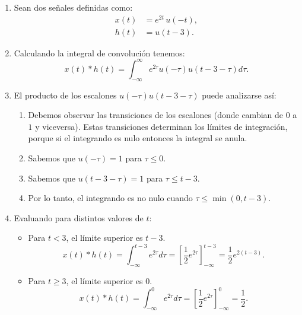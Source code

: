\documentclass[11pt,a4paper,openany]{book}
\begin{document}
\begin{enumerate}
	
	\item Sean dos señales definidas como:
	\begin{align}
		x(t) &= e^{2t} \, u(-t) ,  \\
		h(t) &= u(t-3).
	\end{align}
	
	\item Calculando la integral de convolución tenemos:
	\begin{equation}
		x(t) * h(t) = \int_{-\infty}^{\infty} e^{2\tau} u(-\tau) u(t-3-\tau) d\tau .
	\end{equation}
	
	\item El producto de los escalones $u(-\tau) u(t-3-\tau)$ puede analizarse así:
	\begin{enumerate}
		\item Debemos observar las transiciones de los escalones (donde cambian de $0$ a $1$ y viceversa). Estas transiciones determinan los límites de integración, porque si el integrando es nulo entonces la integral se anula.
		\item Sabemos que $u(-\tau) = 1$ para $\tau \leq 0$.
		\item Sabemos que $u(t-3-\tau) = 1$ para $\tau \leq t-3$.
		\item Por lo tanto, el integrando es no nulo cuando $\tau \leq \min(0, t-3)$.
	\end{enumerate}
	
	\item Evaluando para distintos valores de $t$:
	\begin{itemize}
		\item Para $t < 3$, el límite superior es $t-3$. 
		\begin{equation}
			x(t) * h(t) = \int_{-\infty}^{t-3} e^{2\tau} d\tau = \left[ \frac{1}{2}e^{2\tau} \right]_{-\infty}^{t-3} = \frac{1}{2}e^{2(t-3)}.
		\end{equation}
		
		\item Para $t \geq 3$, el límite superior es $0$.
		\begin{equation}
			x(t) * h(t) = \int_{-\infty}^{0} e^{2\tau} d\tau = \left[ \frac{1}{2}e^{2\tau} \right]_{-\infty}^{0} = \frac{1}{2}.
		\end{equation}
	\end{itemize}
	
\end{enumerate}
\end{document}
